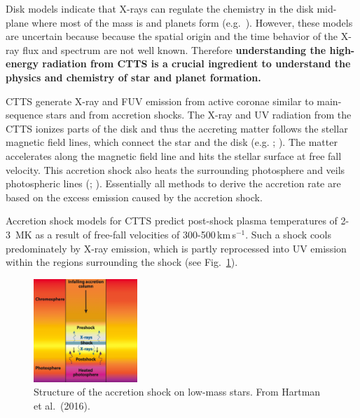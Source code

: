 \documentclass[letterpaper,11pt,twocolumn]{article}
\begin{document}
Disk models indicate that X-rays can regulate the chemistry in the disk mid-plane where most of the mass is and planets form (e.g.\ ). However, these models are uncertain because because the spatial origin and the time behavior of the X-ray flux and spectrum are not well known.
Therefore
{\bf understanding the high-energy radiation from CTTS is a crucial ingredient to understand the physics and chemistry of star and planet formation.} 

CTTS generate X-ray and FUV emission from active coronae similar to main-sequence stars and from accretion shocks.
The X-ray and UV radiation from the CTTS ionizes parts of the disk and thus the accreting matter follows the stellar magnetic field lines, which connect the star and the disk (e.g. ; ). The matter accelerates along the magnetic field line and hits the stellar surface at free fall velocity.
This accretion shock also heats the surrounding photosphere and veils photospheric lines (; ). Essentially all methods to derive 
the accretion rate are based on the excess emission caused by the accretion shock. 

Accretion shock models for CTTS predict post-shock plasma
temperatures of 2-3~MK as a result of free-fall velocities of 
300-500\,km\,s$^{-1}$. Such a shock cools predominately by
X-ray emission, which is partly reprocessed into UV emission within the regions surrounding the shock (see Fig.~\ref{fig:sketch}). 

\begin{figure}[t!]
\centering
\includegraphics[width=0.35\textwidth]{figs/Hartmann_accretion_sketch.png}
\caption{Structure of the accretion shock on low-mass stars. From Hartman et al.\ (2016).
  \label{fig:sketch}}
\end{figure}
\end{document}

